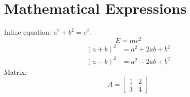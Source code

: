 \documentclass{article}
\begin{document}
\section{Mathematical Expressions}
Inline equation: \(a^2+b^2=c^2\).
\[
E=mc^2
\]
\begin{align}
(a+b)^2 &= a^2+2ab+b^2\\
(a-b)^2 &= a^2-2ab+b^2
\end{align}
Matrix:
\[
A=\begin{bmatrix}1&2\\3&4\end{bmatrix}
\]
\end{document}
